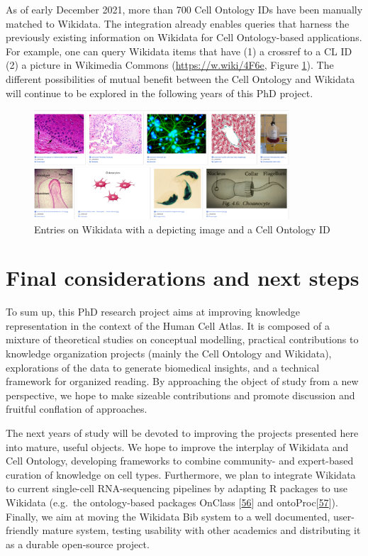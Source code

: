 As of early December 2021, more than 700 Cell Ontology IDs have been manually matched to Wikidata.
The integration already enables queries that harness the previously existing information on Wikidata for Cell Ontology-based applications.
For example, one can query Wikidata items that have (1) a crossref to a CL ID (2) a picture in Wikimedia Commons (\url{https://w.wiki/4F6e}, Figure \ref{fig:cl_images}).
The different possibilities of mutual benefit between the Cell Ontology and Wikidata will continue to be explored in the following years of this PhD project.

\begin{figure}
\hypertarget{fig:cl_images}{%
\centering
\includegraphics[width=0.85\textwidth,height=\textheight]{images/137942026-7645f368-d62a-4434-be05-083555cf0757.png}
\caption{Entries on Wikidata with a depicting image and a Cell Ontology ID}\label{fig:cl_images}
}
\end{figure}

\hypertarget{final-considerations-and-next-steps}{%
\section{Final considerations and next steps}\label{final-considerations-and-next-steps}}

To sum up, this PhD research project aims at improving knowledge representation in the context of the Human Cell Atlas.
It is composed of a mixture of theoretical studies on conceptual modelling, practical contributions to knowledge organization projects (mainly the Cell Ontology and Wikidata), explorations of the data to generate biomedical insights, and a technical framework for organized reading.
By approaching the object of study from a new perspective, we hope to make sizeable contributions and promote discussion and fruitful conflation of approaches.

The next years of study will be devoted to improving the projects presented here into mature, useful objects.
We hope to improve the interplay of Wikidata and Cell Ontology, developing frameworks to combine community- and expert-based curation of knowledge on cell types.
Furthermore, we plan to integrate Wikidata to current single-cell RNA-sequencing pipelines by adapting R packages to use Wikidata (e.g.~the ontology-based packages OnClass {[}\protect\hyperlink{ref-sW6aNZJB}{56}{]} and ontoProc{[}\protect\hyperlink{ref-15YmDXALp}{57}{]}).
Finally, we aim at moving the Wikidata Bib system to a well documented, user-friendly mature system, testing usability with other academics and distributing it as a durable open-source project.

